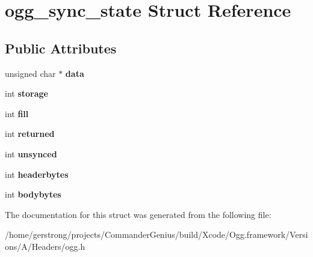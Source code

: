 \hypertarget{structogg__sync__state}{
\section{ogg\_\-sync\_\-state Struct Reference}
\label{structogg__sync__state}
}
\subsection*{Public Attributes}
\begin{DoxyCompactItemize}
\item 
\hypertarget{structogg__sync__state_adfc3f5d5a6434a582205ece0327fcc7d}{
unsigned char $\ast$ {\bfseries data}}
\label{structogg__sync__state_adfc3f5d5a6434a582205ece0327fcc7d}

\item 
\hypertarget{structogg__sync__state_a15fc1bb5161fc4ae87b7a65982776c24}{
int {\bfseries storage}}
\label{structogg__sync__state_a15fc1bb5161fc4ae87b7a65982776c24}

\item 
\hypertarget{structogg__sync__state_a3afef65cd358eab5827304b8c2360c7f}{
int {\bfseries fill}}
\label{structogg__sync__state_a3afef65cd358eab5827304b8c2360c7f}

\item 
\hypertarget{structogg__sync__state_ac1b56ee81f71737f2f6397907f55a2e9}{
int {\bfseries returned}}
\label{structogg__sync__state_ac1b56ee81f71737f2f6397907f55a2e9}

\item 
\hypertarget{structogg__sync__state_a8d538bb32400470f00080e2160158a76}{
int {\bfseries unsynced}}
\label{structogg__sync__state_a8d538bb32400470f00080e2160158a76}

\item 
\hypertarget{structogg__sync__state_abb64d78f386bc413527df838f2f681d5}{
int {\bfseries headerbytes}}
\label{structogg__sync__state_abb64d78f386bc413527df838f2f681d5}

\item 
\hypertarget{structogg__sync__state_aa7ea6e81b751baaa04e4b49cb04e8317}{
int {\bfseries bodybytes}}
\label{structogg__sync__state_aa7ea6e81b751baaa04e4b49cb04e8317}

\end{DoxyCompactItemize}


The documentation for this struct was generated from the following file:\begin{DoxyCompactItemize}
\item 
/home/gerstrong/projects/CommanderGenius/build/Xcode/Ogg.framework/Versions/A/Headers/ogg.h\end{DoxyCompactItemize}
